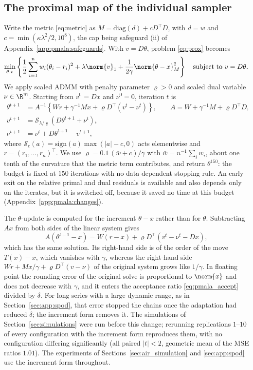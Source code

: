 \subsection{The proximal map of the individual sampler}
\label{app:pmala:admm}

Write the metric \eqref{eq:metric} as $M = \mathrm{diag}(d) + cD^\top D$, with $d = w$ and $c = \min(\kappa\lambda^2/2, 10^8)$, the cap being safeguard (ii) of Appendix~\ref{app:pmala:safeguards}. With $v = D\theta$, problem \eqref{eq:prox} becomes
\[
\min_{\theta, v}\left\{\frac12\sum_{i=1}^n w_i(\theta_i - r_i)^2 + \lambda\norm{v}_1 + \frac{1}{2\gamma}\norm{\theta - x}_M^2\right\} \quad \text{subject to } v = D\theta .
\]
We apply scaled ADMM with penalty parameter $\varrho > 0$ and scaled dual variable $\nu \in \R^m$. Starting from $v^0 = Dx$ and $\nu^0 = 0$, iteration $t$ is
\begin{align*}
\theta^{t+1} &= A^{-1}\left\{ W r + \gamma^{-1} M x + \varrho D^\top (v^t - \nu^t) \right\}, \qquad A = W + \gamma^{-1} M + \varrho D^\top D, \\
v^{t+1} &= \mathcal{S}_{\lambda/\varrho}\!\left(D\theta^{t+1} + \nu^t\right), \\
\nu^{t+1} &= \nu^t + D\theta^{t+1} - v^{t+1},
\end{align*}
where $\mathcal{S}_c(a) = \mathrm{sign}(a)\max(|a| - c, 0)$ acts elementwise and $r = (r_1,\ldots,r_n)^\top$. We use $\varrho = 0.1\,(\bar w + c)/\gamma$ with $\bar w = n^{-1}\sum_i w_i$, about one tenth of the curvature that the metric term contributes, and return $\theta^{150}$: the budget is fixed at $150$ iterations with no data-dependent stopping rule. An early exit on the relative primal and dual residuals is available and also depends only on the iterates, but it is switched off, because it saved no time at this budget (Appendix~\ref{app:pmala:changes}).

The $\theta$-update is computed for the increment $\theta - x$ rather than for $\theta$. Subtracting $Ax$ from both sides of the linear system gives
\[
A(\theta^{t+1} - x) = W(r - x) + \varrho D^\top\left(v^t - \nu^t - Dx\right),
\]
which has the same solution. Its right-hand side is of the order of the move $T(x) - x$, which vanishes with $\gamma$, whereas the right-hand side $Wr + Mx/\gamma + \varrho D^\top(v - \nu)$ of the original system grows like $1/\gamma$. In floating point the rounding error of the original solve is proportional to $\norm{x}$ and does not decrease with $\gamma$, and it enters the acceptance ratio \eqref{eq:pmala_accept} divided by $\delta$. For long series with a large dynamic range, as in Section~\ref{sec:app:spod}, that error stopped the chains once the adaptation had reduced $\delta$; the increment form removes it. The simulations of Section~\ref{sec:simulations} were run before this change; rerunning replications $1$--$10$ of every configuration with the increment form reproduces them, with no configuration differing significantly (all paired $|t| < 2$, geometric mean of the MSE ratios $1.01$). The experiments of Sections~\ref{sec:air_simulation} and \ref{sec:app:spod} use the increment form throughout.

